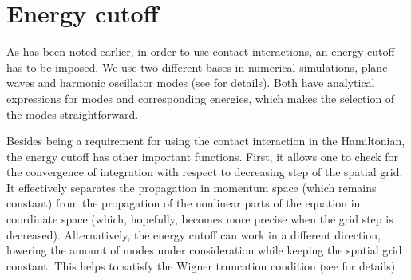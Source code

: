 \section{Energy cutoff}

As has been noted earlier, in order to use contact interactions, an energy cutoff has to be imposed.
We use two different bases in numerical simulations, plane waves and harmonic oscillator modes (see  for details).
Both have analytical expressions for modes and corresponding energies, which makes the selection of the modes straightforward.

Besides being a requirement for using the contact interaction in the Hamiltonian, the energy cutoff has other important functions.
First, it allows one to check for the convergence of integration with respect to decreasing step of the spatial grid.
It effectively separates the propagation in momentum space (which remains constant) from the propagation of the nonlinear parts of the equation in coordinate space (which, hopefully, becomes more precise when the grid step is decreased).
Alternatively, the energy cutoff can work in a different direction, lowering the amount of modes under consideration while keeping the spatial grid constant.
This helps to satisfy the Wigner truncation condition (see  for details).
